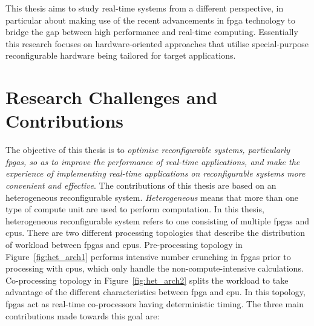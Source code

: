 This thesis aims to study real-time systems from a different perspective, in particular about making use of the recent advancements in \gls{fpga} technology to bridge the gap between high performance and real-time computing.
Essentially this research focuses on hardware-oriented approaches that utilise special-purpose reconfigurable hardware being tailored for target applications.

\section{Research Challenges and Contributions}

The objective of this thesis is to \textit{optimise reconfigurable systems, particularly \glspl{fpga}, so as to improve the performance of real-time applications, and make the experience of implementing real-time applications on reconfigurable systems more convenient and effective}.
The contributions of this thesis are based on an heterogeneous reconfigurable system.
\textit{Heterogeneous} means that more than one type of compute unit are used to perform computation. 
In this thesis, heterogeneous reconfigurable system refers to one consisting of multiple \glspl{fpga} and \glspl{cpu}.
There are two different processing topologies that describe the distribution of workload between \glspl{fpga} and \glspl{cpu}.
Pre-processing topology in Figure~\ref{fig:het_arch1} performs intensive number crunching in \glspl{fpga} prior to processing with \glspl{cpu}, which only handle the non-compute-intensive calculations.
Co-processing topology in Figure~\ref{fig:het_arch2} splits the workload to take advantage of the different characteristics between \gls{fpga} and \gls{cpu}.
In this topology, \glspl{fpga} act as real-time co-processors having deterministic timing.
The three main contributions made towards this goal are:

